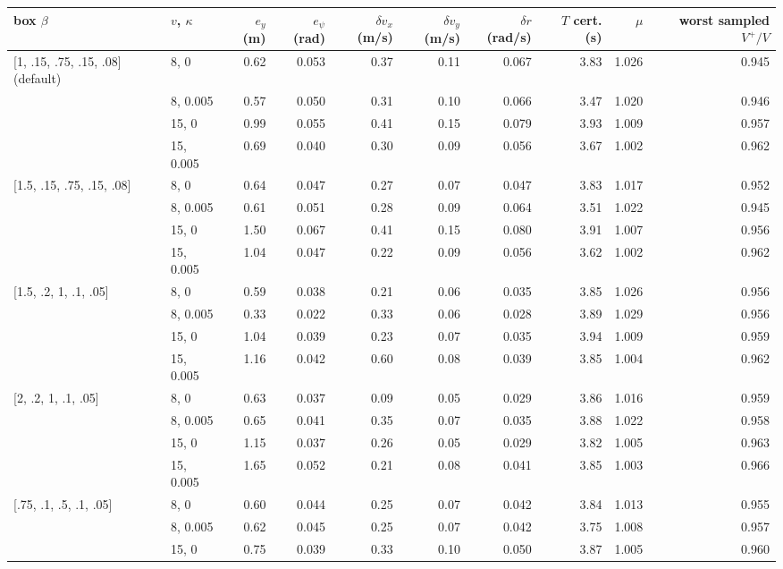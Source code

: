 \documentclass[11pt]{article}
\begin{document}
\begin{center}\small
\begin{tabular}{llrrrrrrrr}
\toprule
box $\beta$ & $v$, $\kappa$ & $e_y$ (m) & $e_\psi$ (rad) & $\delta v_x$ (m/s) & $\delta v_y$ (m/s) & $\delta r$ (rad/s) & $T$ cert. (s) & $\mu$ & worst sampled $V^+/V$ \\
\midrule
{[1, .15, .75, .15, .08]} (default) & 8, 0 & 0.62 & 0.053 & 0.37 & 0.11 & 0.067 & 3.83 & 1.026 & 0.945 \\
 & 8, 0.005 & 0.57 & 0.050 & 0.31 & 0.10 & 0.066 & 3.47 & 1.020 & 0.946 \\
 & 15, 0 & 0.99 & 0.055 & 0.41 & 0.15 & 0.079 & 3.93 & 1.009 & 0.957 \\
 & 15, 0.005 & 0.69 & 0.040 & 0.30 & 0.09 & 0.056 & 3.67 & 1.002 & 0.962 \\
\midrule
{[1.5, .15, .75, .15, .08]} & 8, 0 & 0.64 & 0.047 & 0.27 & 0.07 & 0.047 & 3.83 & 1.017 & 0.952 \\
 & 8, 0.005 & 0.61 & 0.051 & 0.28 & 0.09 & 0.064 & 3.51 & 1.022 & 0.945 \\
 & 15, 0 & 1.50 & 0.067 & 0.41 & 0.15 & 0.080 & 3.91 & 1.007 & 0.956 \\
 & 15, 0.005 & 1.04 & 0.047 & 0.22 & 0.09 & 0.056 & 3.62 & 1.002 & 0.962 \\
\midrule
{[1.5, .2, 1, .1, .05]} & 8, 0 & 0.59 & 0.038 & 0.21 & 0.06 & 0.035 & 3.85 & 1.026 & 0.956 \\
 & 8, 0.005 & 0.33 & 0.022 & 0.33 & 0.06 & 0.028 & 3.89 & 1.029 & 0.956 \\
 & 15, 0 & 1.04 & 0.039 & 0.23 & 0.07 & 0.035 & 3.94 & 1.009 & 0.959 \\
 & 15, 0.005 & 1.16 & 0.042 & 0.60 & 0.08 & 0.039 & 3.85 & 1.004 & 0.962 \\
\midrule
{[2, .2, 1, .1, .05]} & 8, 0 & 0.63 & 0.037 & 0.09 & 0.05 & 0.029 & 3.86 & 1.016 & 0.959 \\
 & 8, 0.005 & 0.65 & 0.041 & 0.35 & 0.07 & 0.035 & 3.88 & 1.022 & 0.958 \\
 & 15, 0 & 1.15 & 0.037 & 0.26 & 0.05 & 0.029 & 3.82 & 1.005 & 0.963 \\
 & 15, 0.005 & 1.65 & 0.052 & 0.21 & 0.08 & 0.041 & 3.85 & 1.003 & 0.966 \\
\midrule
{[.75, .1, .5, .1, .05]} & 8, 0 & 0.60 & 0.044 & 0.25 & 0.07 & 0.042 & 3.84 & 1.013 & 0.955 \\
 & 8, 0.005 & 0.62 & 0.045 & 0.25 & 0.07 & 0.042 & 3.75 & 1.008 & 0.957 \\
 & 15, 0 & 0.75 & 0.039 & 0.33 & 0.10 & 0.050 & 3.87 & 1.005 & 0.960 \\

\end{tabular}
\end{center}
\end{document}
